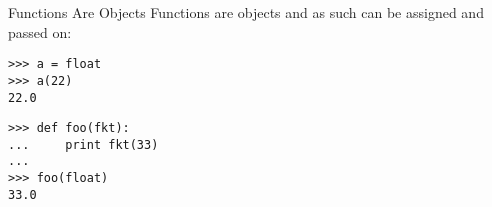 \begin{frame}[fragile]{Functions Are Objects}
Functions are objects and as such can be assigned and passed on:
\begin{lstlisting}[style=Shell]
>>> a = float
>>> a(22)
22.0
\end{lstlisting}
\begin{lstlisting}[style=Shell]
>>> def foo(fkt):
...     print fkt(33)
...
>>> foo(float)
33.0
\end{lstlisting}
\end{frame}


